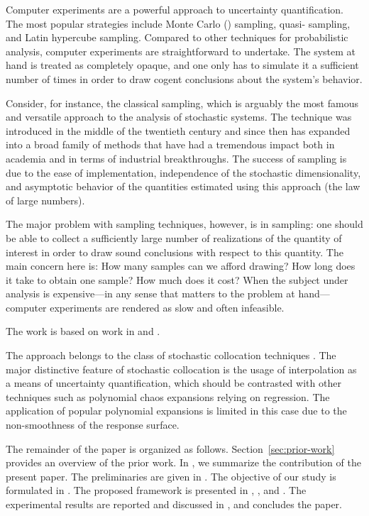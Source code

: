 Computer experiments \cite{santner2003} are a powerful approach to uncertainty
quantification. The most popular strategies include Monte Carlo ()
sampling, quasi- sampling, and Latin hypercube sampling. Compared to
other techniques for probabilistic analysis, computer experiments are
straightforward to undertake. The system at hand is treated as completely
opaque, and one only has to simulate it a sufficient number of times in order to
draw cogent conclusions about the system's behavior.

Consider, for instance, the classical  sampling, which is arguably the
most famous and versatile approach to the analysis of stochastic systems. The
technique was introduced in the middle of the twentieth century and since then
has expanded into a broad family of methods that have had a tremendous impact
both in academia and in terms of industrial breakthroughs. The success of
 sampling is due to the ease of implementation, independence of the
stochastic dimensionality, and asymptotic behavior of the quantities estimated
using this approach (the law of large numbers).

The major problem with sampling techniques, however, is in sampling: one should
be able to collect a sufficiently large number of realizations of the quantity
of interest in order to draw sound conclusions with respect to this quantity.
The main concern here is: How many samples can we afford drawing? How long does
it take to obtain one sample? How much does it cost? When the subject under
analysis is expensive---in any sense that matters to the problem at
hand---computer experiments are rendered as slow and often infeasible.

The work is based on work in \cite{klimke2006} and \cite{ma2009}.

The approach belongs to the class of stochastic collocation techniques
\cite{xiu2010}. The major distinctive feature of stochastic collocation is the
usage of interpolation as a means of uncertainty quantification, which should be
contrasted with other techniques such as polynomial chaos expansions relying on
regression. The application of popular polynomial expansions is limited in this
case due to the non-smoothness of the response surface.

The remainder of the paper is organized as follows. Section~\ref{sec:prior-work}
provides an overview of the prior work. In , we summarize the
contribution of the present paper. The preliminaries are given in
. The objective of our study is formulated in
. The proposed framework is presented in
, , and . The experimental
results are reported and discussed in , and
 concludes the paper.
